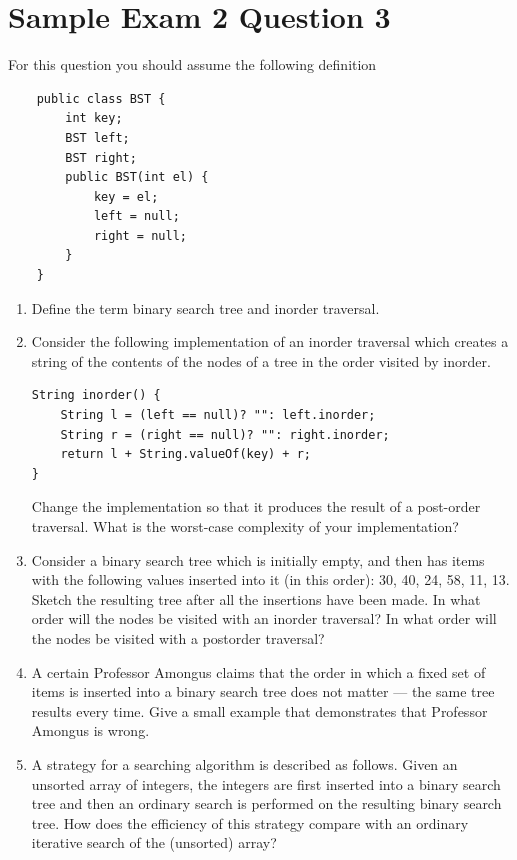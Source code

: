 \documentclass[twoside=false,DIV=14]{scrartcl}
\begin{document}
\section{Sample Exam 2 Question 3}
For this question you should assume the following definition
\begin{lstlisting}
    public class BST {
        int key;
        BST left;
        BST right;
        public BST(int el) {
            key = el;
            left = null;
            right = null;
        }
    }
\end{lstlisting}
\begin{enumerate}
\item Define the term binary search tree and inorder traversal.
\item Consider the following implementation of an inorder traversal which creates a string
of the contents of the nodes of a tree in the order visited by inorder.
\begin{lstlisting}
String inorder() {
    String l = (left == null)? "": left.inorder;
    String r = (right == null)? "": right.inorder;
    return l + String.valueOf(key) + r;
}
\end{lstlisting}
Change the implementation so that it produces the result of a post-order traversal. What is the worst-case complexity of your implementation?
\item Consider a binary search tree which is initially empty, and then has items with the following values inserted into it (in this order): 30, 40, 24, 58, 11, 13. Sketch the resulting tree after all the insertions have been made. In what order will the nodes be visited with an inorder traversal? In what order will the nodes be visited with a postorder traversal?
\item A certain Professor Amongus claims that the order in which a fixed set of items is inserted into a binary search tree does not matter — the same tree results every time. Give a small example that demonstrates that Professor Amongus is wrong.
\item A strategy for a searching algorithm is described as follows. Given an unsorted array of integers, the integers are first inserted into a binary search tree and then an ordinary search is performed on the resulting binary search tree. How does the efficiency of this strategy compare with an ordinary iterative search of the (unsorted) array?
\end{enumerate}
\end{document}
